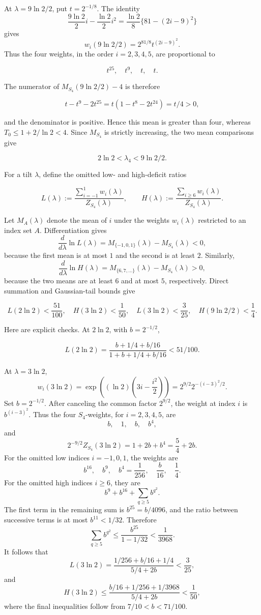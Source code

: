 \documentclass[11pt,reqno]{amsart}
\begin{document}
At \(\lambda=9{\ln 2}/2\), put \(t=2^{-1/8}\). The identity
\[
 \frac{9\ln 2}{2}i-\frac{\ln 2}{2}i^2
 =\frac{\ln 2}{8}\{81-(2i-9)^2\}
\]
gives
\[
 w_i(9{\ln 2}/2)=2^{81/8}t^{(2i-9)^2}.
\]
Thus the four weights, in the order
\(i=2,3,4,5\), are proportional to

\[
 t^{25},\quad t^9,\quad t,\quad t.
\]

The numerator of \(M_{S_4}(9{\ln 2}/2)-4\) is therefore

\[
 t-t^9-2t^{25}=t(1-t^8-2t^{24})=t/4>0,                 \tag{5.5}
\]

and the denominator is positive.  Hence this mean is greater than four,
whereas \(T_0\le1+2/{\ln 2}<4\).  Since \(M_{S_4}\) is strictly
increasing, the two mean comparisons give

\[
 2{\ln 2}<\lambda_4<9{\ln 2}/2.                                     \tag{5.6}
\]

For a tilt \(\lambda\), define the omitted low- and high-deficit ratios

\[
 L(\lambda):=
 \frac{\sum_{i=-1}^{1}w_i(\lambda)}{Z_{S_4}(\lambda)},
 \qquad
 H(\lambda):=
 \frac{\sum_{i\ge6}w_i(\lambda)}{Z_{S_4}(\lambda)}.
\]

Let \(M_A(\lambda)\) denote the mean of \(i\) under the weights
\(w_i(\lambda)\) restricted to an index set \(A\). Differentiation gives
\[
 \frac{d}{d\lambda}\ln L(\lambda)
 =M_{\{-1,0,1\}}(\lambda)-M_{S_4}(\lambda)<0,
\]
because the first mean is at most \(1\) and the second is at least \(2\).
Similarly,
\[
 \frac{d}{d\lambda}\ln H(\lambda)
 =M_{\{6,7,\ldots\}}(\lambda)-M_{S_4}(\lambda)>0,
\]
because the two means are at least \(6\) and at most \(5\), respectively.
Direct summation and Gaussian-tail bounds give

\[
 L(2{\ln 2})<\frac{51}{100},\quad H(3{\ln 2})<\frac1{50},\quad
 L(3{\ln 2})<\frac3{25},\quad H(9{\ln 2}/2)<\frac14.                 \tag{5.7}
\]

Here are explicit checks. At \(2{\ln 2}\), with \(b=2^{-1/2}\),

\[
 L(2{\ln 2})=\frac{b+1/4+b/16}{1+b+1/4+b/16}<51/100.
\]

At \(\lambda=3\ln 2\),
\[
 w_i(3\ln 2)
 =\exp\!\left((\ln 2)\left(3i-\frac{i^2}{2}\right)\right)
 =2^{9/2}2^{-(i-3)^2/2}.
\]
Set \(b=2^{-1/2}\). After canceling the common factor \(2^{9/2}\),
the weight at index \(i\) is \(b^{(i-3)^2}\). Thus the four
\(S_4\)-weights, for \(i=2,3,4,5\), are
\[
 b,\quad 1,\quad b,\quad b^4,
\]
and
\[
 2^{-9/2}Z_{S_4}(3\ln 2)=1+2b+b^4=\frac54+2b.
\]
For the omitted low indices \(i=-1,0,1\), the weights are
\[
 b^{16},\quad b^9,\quad b^4
 =\frac1{256},\quad\frac b{16},\quad\frac14.
\]
For the omitted high indices \(i\ge6\), they are
\[
 b^9+b^{16}+\sum_{q\ge5}b^{q^2}.
\]
The first term in the remaining sum is \(b^{25}=b/4096\), and the
ratio between successive terms is at most \(b^{11}<1/32\). Therefore
\[
 \sum_{q\ge5}b^{q^2}
 \le\frac{b^{25}}{1-1/32}<\frac1{3968}.
\]
It follows that
\[
 L(3\ln 2)
 =\frac{1/256+b/16+1/4}{5/4+2b}<\frac3{25},
\]
and
\[
 H(3\ln 2)
 \le\frac{b/16+1/256+1/3968}{5/4+2b}<\frac1{50},
\]
where the final inequalities follow from \(7/10<b<71/100\).
\end{document}
